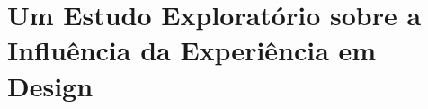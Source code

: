 \chapter{Um Estudo Exploratório sobre a Influência da Experiência em Design}
\label{cap:estudo-mack}
